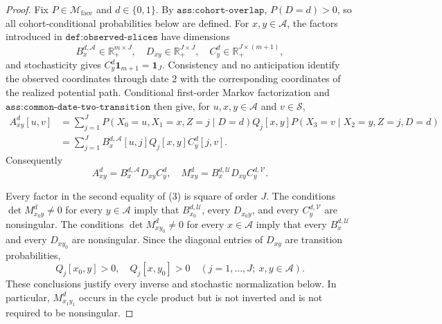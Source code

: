 \documentclass{article}
\begin{document}
\begin{proof}
Fix \(P\in\mathcal M_{\mathrm{face}}\) and \(d\in\{0,1\}\).  By \(\texttt{ass:cohort-overlap}\), \(P(D=d)>0\), so all cohort-conditional probabilities below are defined.  For \(x,y\in\mathcal A\), the factors introduced in \(\texttt{def:observed-slices}\) have dimensions
\[
 B_x^{d,\mathcal A}\in\mathbb R_+^{m\times J},\quad
 D_{xy}\in\mathbb R_+^{J\times J},\quad
 C_y^d\in\mathbb R_+^{J\times(m+1)},
 \tag{1}
\]
and stochasticity gives \(C_y^d\mathbf1_{m+1}=\mathbf1_J\).  Consistency and no anticipation identify the observed coordinates through date \(2\) with the corresponding coordinates of the realized potential path.  Conditional first-order Markov factorization and \(\texttt{ass:common-date-two-transition}\) then give, for \(u,x,y\in\mathcal A\) and \(v\in\mathcal S\),
\[
\begin{aligned}
 A_{xy}^d[u,v]
 &=\sum_{j=1}^J P(X_0=u,X_1=x,Z=j\mid D=d)Q_j[x,y]
 P(X_3=v\mid X_2=y,Z=j,D=d)\\
 &=\sum_{j=1}^J B_x^{d,\mathcal A}[u,j]Q_j[x,y]C_y^d[j,v].
\end{aligned}
\tag{2}
\]
Consequently
\[
 A_{xy}^d=B_x^{d,\mathcal A}D_{xy}C_y^d,
 \quad
 M_{xy}^d=B_x^{d,\mathcal U}D_{xy}C_y^{d,\mathcal V}.
\tag{3}
\]

Every factor in the second equality of (3) is square of order \(J\).  The conditions \(\det M_{x_0y}^d\ne0\) for every \(y\in\mathcal A\) imply that \(B_{x_0}^{d,\mathcal U}\), every \(D_{x_0y}\), and every \(C_y^{d,\mathcal V}\) are nonsingular.  The conditions \(\det M_{xy_0}^d\ne0\) for every \(x\in\mathcal A\) imply that every \(B_x^{d,\mathcal U}\) and every \(D_{xy_0}\) are nonsingular.  Since the diagonal entries of \(D_{xy}\) are transition probabilities,
\[
 Q_j[x_0,y]>0,\quad Q_j[x,y_0]>0
 \quad(j=1,\ldots,J;\ x,y\in\mathcal A).
\tag{4}
\]
These conclusions justify every inverse and stochastic normalization below.  In particular, \(M_{x_1y_1}^d\) occurs in the cycle product but is not inverted and is not required to be nonsingular.


\end{proof}
\end{document}
